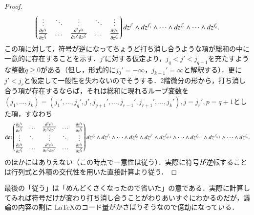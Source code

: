 \begin{proof}
\begin{equation}
\begin{pmatrix}
    \vdots & \ddots & \vdots & \ddots & \vdots \\
    \frac{\partial y^{i_k}}{\partial z^{j_1'}} & \dots & \frac{\partial^2 y^{i_k}}{\partial z^{j'} \partial z^{j_r'}} & \dots & \frac{\partial y^{i_k}}{\partial z^{j_k'}} \\
    \end{pmatrix}
\mathop{}\!d z^{j'} \wedge \mathop{}\!d z^{j_1'} \wedge \dots \wedge \mathop{}\!d z^{j_r'} \wedge \dots \wedge \mathop{}\!d z^{j_k'}.
\end{equation}
この項に対して，符号が逆になってちょうど打ち消し合うような項が総和の中に一意的に存在することを示す．$j'$に対する仮定より，$j_q < j' < j_{q+1}$を充たすような整数$q \geq 0$がある（但し，形式的に$j_{0}' = -\infty$，$j_{k+1}' = \infty$と解釈する）．更に$j' < j_r$と仮定して一般性を失わないのでそうする．2階微分の形から，打ち消し合う項が存在するならば，それは総和に現れるループ変数を$(j_1, \dots, j_k) = (j_1', \dots, j_{q}', j', j_{q+1}', \dots, j_{r-1}', j_{r+1}', \dots, j_k'), j = j_r', p = q+1$とした項，すなわち
\begin{equation}
\det
    \begin{pmatrix}
    \frac{\partial y^{i_1}}{\partial z^{j_1'}} & \dots & \frac{\partial^2 y^{i_1}}{\partial z^{j_r'} \partial z^{j'}} & \dots & \frac{\partial y^{i_1}}{\partial z^{j_k'}} \\
    \vdots & \ddots & \vdots & \ddots & \vdots \\
    \frac{\partial y^{i_k}}{\partial z^{j_1'}} & \dots & \frac{\partial^2 y^{i_k}}{\partial z^{j_r'} \partial z^{j'}} & \dots & \frac{\partial y^{i_k}}{\partial z^{j_k'}} \\
    \end{pmatrix}
\dif z^{j_r'} \wedge \dif z^{j_1'} \wedge \dots \wedge \dif z^{j_q'} \wedge \dif z^{j'} \wedge \dif z^{j_{q+1}'} \wedge \dots \wedge \dif z^{j_{r-1}'} \wedge \dif z^{j_{r+1}'} \wedge \dots \wedge \dif z^{j_k'}.
\end{equation}
のほかにはありえない（この時点で一意性は従う）．実際に符号が逆転することは行列式と外積の交代性を用いた直接計算より従う．
\end{proof}

\begin{que}
最後の「従う」は「めんどくさくなったので省いた」の意である．実際に計算してみれば符号だけが変わり打ち消し合うことがわりあいすぐにわかるのだが，議論の内容の割に \LaTeX のコード量がかさばりそうなので億劫になっている．
\end{que}

